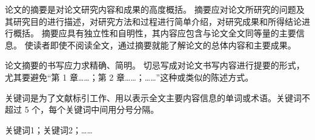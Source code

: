 \begin{center}
	\heiti{}\textmd{\thesisname}
	\vspace{2mm}
	\ifx\subtitle\undefined\else
	\begin{spacing}{1.2}
		\sanhao\selectfont{\textmd{\kaishu{-----}\subtitle}}
	\end{spacing}
	\fi
\end{center}
\vspace{1em}

\setlength{\parskip}{0em}

\textbf{\heiti{}}%
{\kaishu
论文的摘要是对论文研究内容和成果的高度概括。
摘要应对论文所研究的问题及其研究目的进行描述，对研究方法和过程进行简单介绍，对研究成果和所得结论进行概括。
摘要应具有独立性和自明性，其内容应包含与论文全文同等量的主要信息。
使读者即使不阅读全文，通过摘要就能了解论文的总体内容和主要成果。
\par
论文摘要的书写应力求精确、简明。
切忌写成对论文书写内容进行提要的形式，尤其要避免“第 1 章……；第 2 章……；……”这种或类似的陈述方式。
\par
关键词是为了文献标引工作、用以表示全文主要内容信息的单词或术语。关键词不超过 5 个，每个关键词中间用分号分隔。
\par
}
\vspace{1em}
\textbf{\heiti{}}
{\kaishu
关键词1；关键词2；……
}
\vspace{15mm}

\ifx\enthesisname\undefined\else
\begin{spacing}{0.95}
	\centering
	\sanhao\textbf{\rmfamily{\enthesisname}}
	\vspace{2mm}
	\ifx\subtitle\undefined\else
	\begin{spacing}{1.2}
		\sihao\selectfont{\textmd{\kaishu{-----}\rmfamily\textbf{\ensubtitle}}}
	\end{spacing}
	\fi
\end{spacing}
\vspace{0em}
\setlength{\parskip}{0em}


